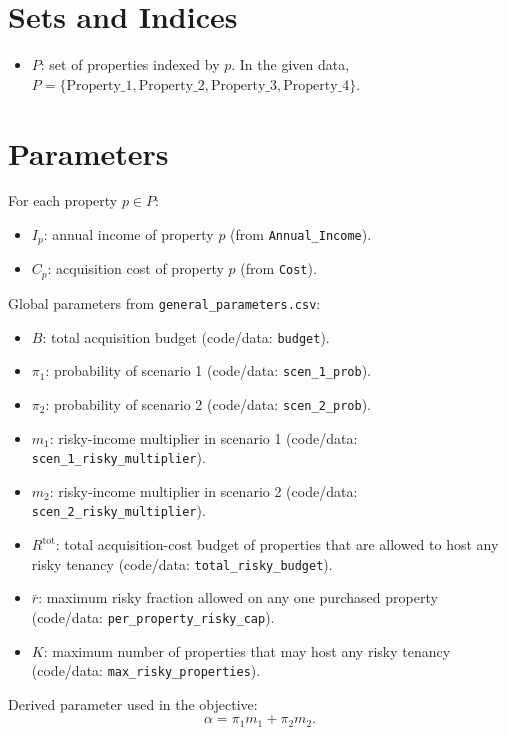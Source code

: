 \section*{Sets and Indices}

\begin{itemize}
    \item $P$: set of properties indexed by $p$. In the given data, $P=\{\text{Property\_1},\text{Property\_2},\text{Property\_3},\text{Property\_4}\}$.
\end{itemize}

\section*{Parameters}

For each property $p \in P$:
\begin{itemize}
    \item $I_p$: annual income of property $p$ (from \texttt{Annual\_Income}).
    \item $C_p$: acquisition cost of property $p$ (from \texttt{Cost}).
\end{itemize}

Global parameters from \texttt{general\_parameters.csv}:
\begin{itemize}
    \item $B$: total acquisition budget (code/data: \texttt{budget}).
    \item $\pi_1$: probability of scenario 1 (code/data: \texttt{scen\_1\_prob}).
    \item $\pi_2$: probability of scenario 2 (code/data: \texttt{scen\_2\_prob}).
    \item $m_1$: risky-income multiplier in scenario 1 (code/data: \texttt{scen\_1\_risky\_multiplier}).
    \item $m_2$: risky-income multiplier in scenario 2 (code/data: \texttt{scen\_2\_risky\_multiplier}).
    \item $R^{\text{tot}}$: total acquisition-cost budget of properties that are allowed to host any risky tenancy (code/data: \texttt{total\_risky\_budget}).
    \item $\bar r$: maximum risky fraction allowed on any one purchased property (code/data: \texttt{per\_property\_risky\_cap}).
    \item $K$: maximum number of properties that may host any risky tenancy (code/data: \texttt{max\_risky\_properties}).
\end{itemize}

Derived parameter used in the objective:
\[
\alpha = \pi_1 m_1 + \pi_2 m_2.
\]


